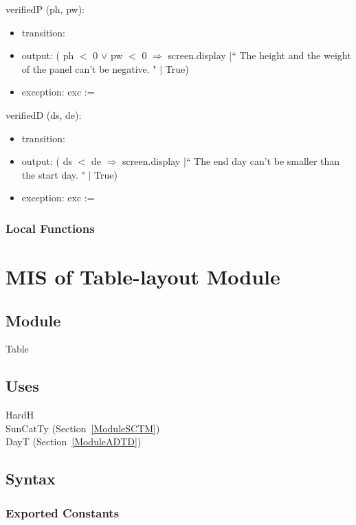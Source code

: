 \documentclass[12pt, titlepage]{article}
\begin{document}
\noindent  verifiedP (ph, pw):
\begin{itemize}
\item transition: 
\item output: ( ph $<$ 0 $\lor$ pw $<$ 0 $\Rightarrow$ screen.display |`` The height and the weight of the panel can't be negative. " $|$ True)
\item exception: exc := 
\end{itemize}

\noindent  verifiedD (ds, de):
\begin{itemize}
\item transition: 
\item output: ( ds $<$ de $\Rightarrow$ screen.display |`` The end day can't be smaller than the start day. " $|$ True)
\item exception: exc := 
\end{itemize}

\subsubsection{Local Functions}



\newpage



\section{MIS of Table-layout Module} \label{ModuleT} 

\subsection{Module}
Table\\

\subsection{Uses}
HardH\\
SunCatTy (Section~\ref{ModuleSCTM}) \\
DayT (Section~\ref{ModuleADTD}) \\

\subsection{Syntax}

\subsubsection{Exported Constants}
\end{document}
